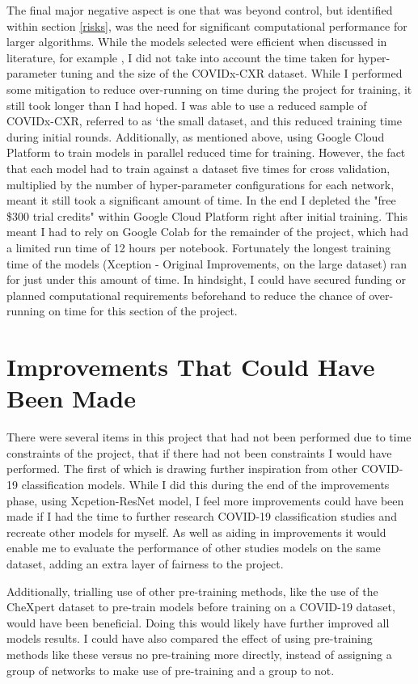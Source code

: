 The final major negative aspect is one that was beyond control, but identified within section \ref{risks}, was the need for significant computational performance for larger algorithms. While the models selected were efficient when discussed in literature, for example \cite{KerasApp92:online}, I did not take into account the time taken for hyper-parameter tuning and the size of the COVIDx-CXR dataset. While I performed some mitigation to reduce over-running on time during the project for training, it still took longer than I had hoped. I was able to use a reduced sample of COVIDx-CXR, referred to as ‘the small dataset, and this reduced training time during initial rounds. Additionally, as mentioned above, using Google Cloud Platform to train models in parallel reduced time for training. However, the fact that each model had to train against a dataset five times for cross validation, multiplied by the number of hyper-parameter configurations for each network, meant it still took a significant amount of time. In the end I depleted the "free \$300 trial credits" within Google Cloud Platform right after initial training. This meant I had to rely on Google Colab for the remainder of the project, which had a limited run time of 12 hours per notebook. Fortunately the longest training time of the models (Xception - Original Improvements, on the large dataset) ran for just under this amount of time. In hindsight, I could have secured funding or planned computational requirements beforehand to reduce the chance of over-running on time for this section of the project.

\section{Improvements That Could Have Been Made}
There were several items in this project that had not been performed due to time constraints of the project, that if there had not been constraints I would have performed. The first of which is drawing further inspiration from other COVID-19 classification models. While I did this during the end of the improvements phase, using \cite{fitriasari2021improvement} Xcpetion-ResNet model, I feel more improvements could have been made if I had the time to further research COVID-19 classification studies and recreate other models for myself. As well as aiding in improvements it would enable me to evaluate the performance of other studies models on the same dataset, adding an extra layer of fairness to the project.

Additionally, trialling use of other pre-training methods, like the \cite{bressem2020comparing} use of the CheXpert dataset to pre-train models before training on a COVID-19 dataset, would have been beneficial. Doing this would likely have further improved all models results. I could have also compared the effect of using pre-training methods like these versus no pre-training more directly, instead of assigning a group of networks to make use of pre-training and a group to not.

